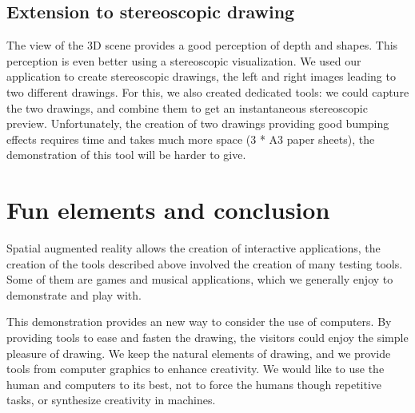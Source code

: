 \documentclass{article}
\begin{document}
\subsection{Extension to stereoscopic drawing} 
The view of the 3D scene provides a good perception of depth and shapes. This perception is even better using a stereoscopic visualization. We used our application to create stereoscopic drawings, the left and right images leading to two different drawings. For this, we also created dedicated tools: we could capture the two drawings, and combine them to get an instantaneous stereoscopic preview. Unfortunately, the creation of two drawings providing good bumping effects requires time and takes much more space (3 * A3 paper sheets), the demonstration of this tool will be harder to give.  

\section{Fun elements and conclusion}
Spatial augmented reality allows the creation of interactive applications, the creation of the tools described above involved the creation of many testing tools. Some of them are games and musical applications, which we generally enjoy to demonstrate and play with. 

This demonstration provides an new way to consider the use of computers. By providing tools to ease and fasten the drawing, the visitors could enjoy the simple pleasure of drawing. We keep the natural elements of drawing, and we provide tools from computer graphics to enhance creativity. We would like to use the human and computers to its best, not to force the humans though repetitive tasks, or synthesize creativity in machines. 
\end{document}
